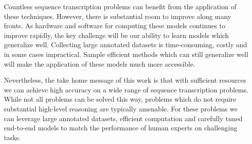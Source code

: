 Countless sequence transcription problems can benefit from the application of
these techniques. However, there is substantial room to improve along many
fronts. As hardware and software for computing these models continues to
improve rapidly, the key challenge will be our ability to learn models which
generalize well. Collecting large annotated datasets is time-consuming, costly
and in some cases impractical. Sample efficient methods which can still
generalize well will make the application of these models much more accessible.

Nevertheless, the take home message of this work is that with sufficient
resources we can achieve high accuracy on a wide range of sequence
transcription problems. While not all problems can be solved this way, problems
which do not require substantial high-level reasoning are typically amenable.
For these problems we can leverage large annotated datasets, efficient
computation and carefully tuned end-to-end models to match the performance of
human experts on challenging tasks.
